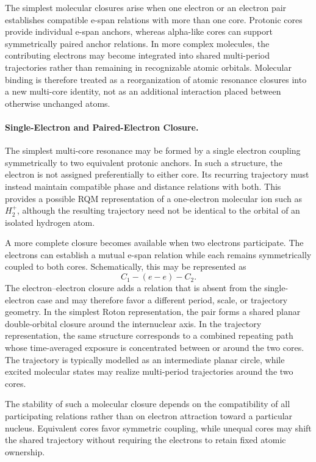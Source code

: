 \documentclass[11pt,a4paper]{article}
\begin{document}
The simplest molecular closures arise when one electron or an electron pair establishes compatible e-span relations with more than one core. Protonic cores provide individual e-span anchors, whereas alpha-like cores can support symmetrically paired anchor relations. In more complex molecules, the contributing electrons may become integrated into shared multi-period trajectories rather than remaining in recognizable atomic orbitals. Molecular binding is therefore treated as a reorganization of atomic resonance closures into a new multi-core identity, not as an additional interaction placed between otherwise unchanged atoms.


\paragraph{Single-Electron and Paired-Electron Closure.}
The simplest multi-core resonance may be formed by a single electron coupling symmetrically to two equivalent protonic anchors. In such a structure, the electron is not assigned preferentially to either core. Its recurring trajectory must instead maintain compatible phase and distance relations with both. This provides a possible RQM representation of a one-electron molecular ion such as \(H_2^+\), although the resulting trajectory need not be identical to the orbital of an isolated hydrogen atom.

A more complete closure becomes available when two electrons participate. The electrons can establish a mutual e-span relation while each remains symmetrically coupled to both cores. Schematically, this may be represented as
\[
C_1-(e-e)-C_2.
\]
The electron--electron closure adds a relation that is absent from the single-electron case and may therefore favor a different period, scale, or trajectory geometry. In the simplest Roton representation, the pair forms a shared planar double-orbital closure around the internuclear axis. In the trajectory representation, the same structure corresponds to a combined repeating path whose time-averaged exposure is concentrated between or around the two cores. The trajectory is typically modelled as an intermediate planar circle, while excited molecular states may realize multi-period trajectories around the two cores.

The stability of such a molecular closure depends on the compatibility of all participating relations rather than on electron attraction toward a particular nucleus. Equivalent cores favor symmetric coupling, while unequal cores may shift the shared trajectory without requiring the electrons to retain fixed atomic ownership.
\end{document}
